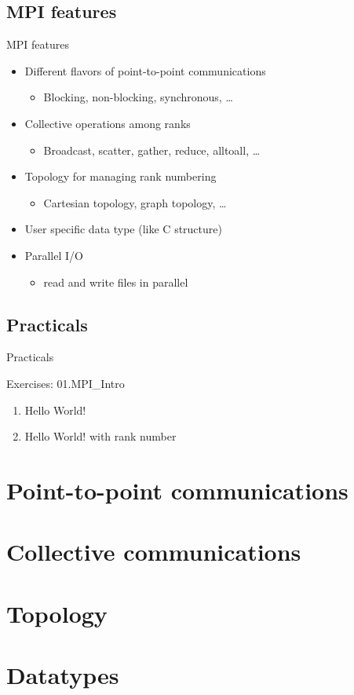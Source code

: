 \documentclass[aspectratio=43]{beamer}
\begin{document}
\subsection{MPI features}
\begin{frame}{MPI features}
\begin{itemize}
    \item Different flavors of point-to-point communications
    \begin{itemize}
        \item Blocking, non-blocking, synchronous, \ldots
    \end{itemize}
    \item Collective operations among ranks
    \begin{itemize}
        \item Broadcast, scatter, gather, reduce, alltoall, \ldots
    \end{itemize}
    \item Topology for managing rank numbering
    \begin{itemize}
        \item Cartesian topology, graph topology, \ldots
    \end{itemize}
    \item User specific data type (like C structure)
    \item Parallel I/O
    \begin{itemize}
        \item read and write files in parallel
    \end{itemize}
\end{itemize}
\end{frame}

\subsection{Practicals}
\begin{frame}{Practicals}
    \begin{brown2block}{Exercises: 01.MPI\_Intro}
    \begin{enumerate}
    \item Hello World!
    \item Hello World! with rank number
    \end{enumerate}
    \end{brown2block}
\end{frame}

\section{Point-to-point communications}
\section{Collective communications}
\section{Topology}
\section{Datatypes}

\end{document}
